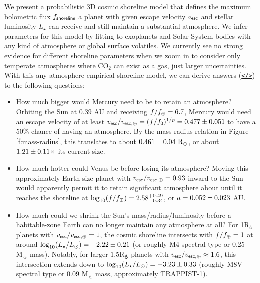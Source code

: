 \documentclass[modern,linenumbers,trackchanges]{aastex7}
\begin{document}
We present a probabilistic 3D cosmic shoreline model that defines the maximum bolometric flux $f_{\sf shoreline}$ a planet with given escape velocity $v_{\sf esc}$ and stellar luminosity $L_\star$ can receive and still maintain a substantial atmosphere. We infer parameters for this model by fitting to exoplanets and Solar System bodies with any kind of atmosphere or global surface volatiles. We currently see no strong evidence for different shoreline parameters when we zoom in to consider only temperate atmospheres where CO$_2$ can exist as a gas, just larger uncertainties. With this any-atmosphere empirical shoreline model, we can derive answers (\href{https://github.com/zkbt/shoreline/blob/main/notebooks/apply-shoreline.ipynb}{\texttt{</>}}) to the following questions:
\begin{itemize}
\item How much bigger would Mercury need to be to retain an atmosphere? Orbiting the Sun at 0.39 AU and receiving $f/f_\oplus = 6.7$, Mercury would need an escape velocity of at least $v_{\sf esc}/v_{\sf esc, \oplus} = (f/f_{\sf 0})^{1/p} = 0.477 \pm 0.051$ to have a 50\% chance of having an atmosphere. By the mass-radius relation in Figure \ref{f:mass-radius}, this translates to about $0.461 \pm 0.04~ \mathrm{R_\oplus}$, or about $1.21 \pm 0.11 \times$ its current size. 

\item How much hotter could Venus be before losing its atmosphere? Moving this approximately Earth-size planet with $v_{\sf esc}/v_{\sf esc, \oplus} = 0.93$ inward to the Sun would apparently permit it to retain significant atmosphere about until it reaches the shoreline at $\log_{10} (f/f_{\oplus}) = 2.58_{-0.34}^{+0.49}$, or $a = 0.052 \pm 0.023$ AU.

\item How much could we shrink the Sun's mass/radius/luminosity before a habitable-zone Earth can no longer maintain any atmosphere at all? For 1$\mathrm{R_\earth}$ planets with $v_{\sf esc}/v_{\sf esc, \oplus} = 1$, the cosmic shoreline intersects with $f/f_\oplus =1 $ at around $\log_{10}(L_\star/L_\odot) = -2.22 \pm 0.21$ (or roughly M4 spectral type or 0.25 $\mathrm{M_\sun}$ mass). Notably, for larger $1.5 \mathrm{R_\earth}$ planets with $v_{\sf esc}/v_{\sf esc, \oplus} \approx 1.6$, this intersection extends down to $\log_{10}(L_\star/L_\odot) = -3.23 \pm 0.33$ (roughly M8V spectral type or 0.09 $\mathrm{M_\sun}$ mass, approximately TRAPPIST-1).


\end{itemize}
\end{document}

